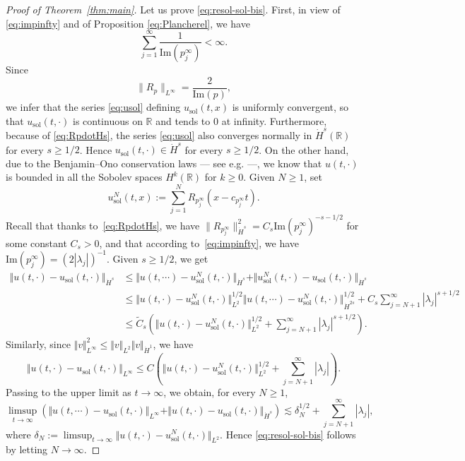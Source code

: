 \documentclass[english, 12pt]{amsart}%
\newcommand{\R}{\mathbb{R}}
\renewcommand{\Im}{\mathrm{Im}}
\numberwithin{equation}{section}
\begin{document}
\begin{proof}[Proof of Theorem~\ref{thm:main}]
Let us prove \eqref{eq:resol-sol-bis}. First, in view of \eqref{eq:impinfty} and of Proposition \eqref{eq:Plancherel}, we have
\[ \sum_{j=1}^\infty \frac{1}{\Im (p_j^\infty)} <\infty .\]
Since 
\[\| R_p\|_{L^\infty}=\frac{2}{\Im (p)},\]
we infer that the series \eqref{eq:usol} defining $u_{\mathrm{sol}}(t,x)$ is uniformly convergent, so that $u_{\mathrm{sol}}(t,\cdot )$ is continuous on $\R$ and tends to $0$ at infinity. Furthermore, because of \eqref{eq:RpdotHs}, the series \eqref{eq:usol} also converges normally in $\dot H^s(\R)$ for every $s\geq 1/2$. Hence $u_{\mathrm{sol}}(t,\cdot )\in \dot H^s$ for every $s\geq 1/2$. 
On the other hand, due to the Benjamin--Ono conservation laws --- see e.g. \cite{Gerard26} ---, we know that $u(t,\cdot )$ is bounded in all the Sobolev spaces $H^k (\R)$ for $k\geq 0$. 
Given $N\geq 1$, set
\[ u_{\mathrm{sol}}^N(t,x):=\sum_{j=1}^N R_{p_j^\infty}(x-c_{p_j^\infty}t).\]
Recall that thanks to~\eqref{eq:RpdotHs}, we have $\|R_{p_j^\infty}\|_{\dot{H}^s}^2=C_s\Im (p_j^\infty)^{-s-1/2}$ for some constant $C_s>0$, and that according to~\eqref{eq:impinfty}, we have $\Im(p_j^\infty)=(2|\lambda_j|)^{-1}$. Given $s\geq 1/2$, we get
 \begin{align*}
 \Vert u(t,\cdot)-u_{\mathrm{sol}}(t,\cdot)\Vert _{\dot H^s}&\leq  \Vert u(t,\cdots)-u_{\mathrm{sol}}^N(t,\cdot)\Vert _{\dot H^s}+ \Vert u_{\mathrm{sol}}^N(t,\cdot)-u_{\mathrm{sol}}(t,\cdot)\Vert _{\dot H^s}\\
 &\leq  \Vert u(t,\cdot)-u^N_{\mathrm{sol}}(t,\cdot)\Vert _{L^2}^{1/2} \Vert u(t,\cdots)-u^N_{\mathrm{sol}}(t,\cdot)\Vert _{\dot H^{2s}}^{1/2}+C_s\sum_{j=N+1}^\infty |\lambda_j|^{s+1/2}\\
 &\leq \tilde C_s (\Vert u(t,\cdot)-u^N_{\mathrm{sol}}(t,\cdot)\Vert _{L^2} ^{1/2}+\sum_{j=N+1}^\infty |\lambda_j|^{s+1/2}).
 \end{align*}
 Similarly, since $\Vert v\Vert_{L^\infty}^2\leq \Vert v\Vert_{L^2} \Vert v\Vert_{\dot H^1}$, we have
\[
  \Vert u(t,\cdot)-u_{\mathrm{sol}}(t,\cdot)\Vert _{L^\infty}\leq C (\Vert u(t,\cdot)-u^N_{\mathrm{sol}}(t,\cdot)\Vert _{L^2} ^{1/2}+\sum_{j=N+1}^\infty |\lambda_j|).
\]
Passing to the upper limit as $t\to \infty$, we obtain, for every $N\geq 1$,
 \[ \limsup_{t\to \infty} (  \Vert u(t,\cdots)-u_{\mathrm{sol}}(t,\cdot)\Vert _{L^\infty}+\Vert u(t,\cdot)-u_{\mathrm{sol}}(t,\cdot)\Vert _{\dot H^s})\lesssim  \delta_N^{1/2}+\sum_{j=N+1}^\infty |\lambda_j|,\]
 where $\delta_N:=\limsup_{t\to \infty}\Vert u(t,\cdot)-u^N_{\mathrm{sol}}(t,\cdot)\Vert _{L^2}$. 
Hence \eqref{eq:resol-sol-bis}  follows by letting $N\to \infty$. 
\end{proof}
\end{document}
